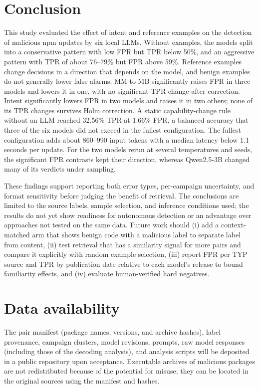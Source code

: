 \documentclass[a4paper,fleqn]{cas-dc}
\begin{document}
\section{Conclusion}\label{sec:conclusion}
This study evaluated the effect of intent and reference examples on the detection
of malicious npm updates by six local LLMs. Without examples, the models split
into a conservative pattern with low FPR but TPR below 50\%, and an aggressive
pattern with TPR of about 76--79\% but FPR above 59\%. Reference examples change
decisions in a direction that depends on the model, and benign examples do not
generally lower false alarms: MM-to-MB significantly raises FPR in three
models and lowers it in one, with no significant TPR change after correction.
Intent significantly lowers FPR in two models and raises it in two others;
none of its TPR changes survives Holm correction. A static capability-change
rule without an LLM reached 32.56\% TPR at 1.66\% FPR, a balanced accuracy that
three of the six models did not exceed in the fullest configuration. The fullest
configuration adds about 860--990 input tokens with a median latency below 1.1
seconds per update. For the two models rerun at several temperatures and seeds,
the significant FPR contrasts kept their direction, whereas Qwen2.5-3B changed
many of its verdicts under sampling.

These findings support reporting both error types, per-campaign uncertainty, and
format sensitivity before judging the benefit of retrieval. The conclusions are
limited to the source labels, sample selection, and inference conditions used;
the results do not yet show readiness for autonomous detection or an advantage
over approaches not tested on the same data. Future work should (i) add a context-matched arm that shows benign code with a
malicious label to separate label from content, (ii) test retrieval that has a
similarity signal for more pairs and compare it explicitly with random example
selection, (iii) report FPR per TYP source and TPR by publication date relative
to each model's release to bound familiarity effects, and (iv) evaluate
human-verified hard negatives.


\section*{Data availability}

The pair manifest (package names, versions, and archive hashes), label
provenance, campaign clusters, model revisions, prompts, raw model responses
(including those of the decoding analysis), and analysis scripts will be deposited in a public repository upon acceptance.
Executable archives of malicious packages are not redistributed because of the
potential for misuse; they can be located in the original sources using the
manifest and hashes.
\end{document}
